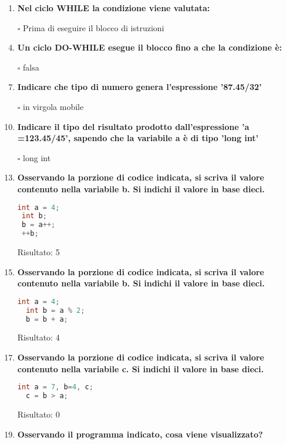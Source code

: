 \documentclass[11pt]{article}
\begin{document}
\begin{enumerate}
\item {\bf Nel ciclo WHILE la condizione viene valutata:}

\item[$\square$]  Prima di eseguire il blocco di istruzioni


\item [\nonumber]
\item {\bf Un ciclo DO-WHILE  esegue il blocco fino a che la condizione \`{e}:}

\item [$\square$] falsa

\item [\nonumber]
\item{\bf Indicare che tipo di numero genera l'espressione '87.45/32'}


\item[$\square$] in virgola mobile

\item [\nonumber]
\item {\bf Indicare il tipo del risultato prodotto dall'espressione 'a =123.45/45', sapendo che la variabile a \`{e} di tipo 'long int'}

\item[$\square$] long int

\item [\nonumber]
 \item {\bf Osservando la porzione di codice indicata, si scriva il valore contenuto nella variabile b. Si indichi il valore in base dieci.}
  \begin{lstlisting}[language=c]
 int a = 4;
 int b; 
 b = a++;
 ++b;
 \end{lstlisting}
 Risultato:  5
 \item [\nonumber]
 \item{\bf Osservando la porzione di codice indicata, si scriva il valore contenuto nella variabile b. Si indichi il valore in base dieci.}
 
  \begin{lstlisting}[language=c]
  int a = 4;
  int b = a % 2;
  b = b + a;
 \end{lstlisting}
  Risultato:  4
  \item [\nonumber]
  \item {\bf Osservando la porzione di codice indicata, si scriva il valore contenuto nella variabile c. Si indichi il valore in base dieci.}
 
  \begin{lstlisting}[language=c]
  int a = 7, b=4, c;
  c = b > a;
  \end{lstlisting}
  Risultato: 0
  \item [\nonumber]
  \item {\bf Osservando il programma indicato, cosa viene visualizzato?}
  

\end{enumerate}
\end{document}
